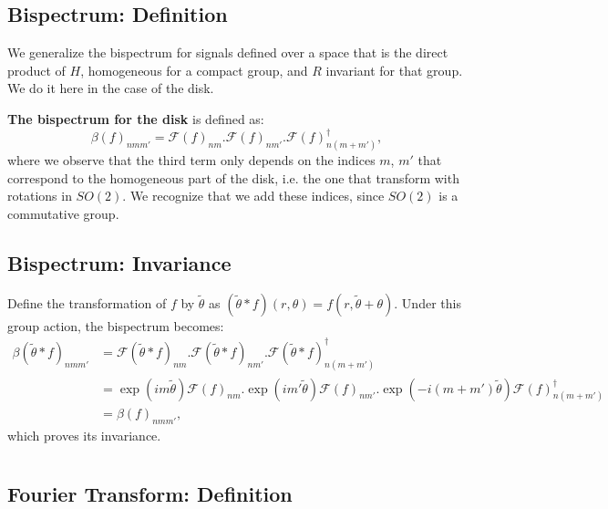 \documentclass{article}
\begin{document}
\subsection{Bispectrum: Definition}

We generalize the bispectrum for signals defined over a space that is the direct product of $H$, homogeneous for a compact group, and $R$ invariant for that group. We do it here in the case of the disk.

\textbf{The bispectrum for the disk} is defined as:
\begin{equation}
    \beta(f)_{nmm'} = \mathcal{F}(f)_{nm}.\mathcal{F}(f)_{nm'}.\mathcal{F}(f)_{n(m+m')}^\dagger,
\end{equation}
where we observe that the third term only depends on the indices $m$, $m'$ that correspond to the homogeneous part of the disk, i.e. the one that transform with rotations in $SO(2)$. We recognize that we add these indices, since $SO(2)$ is a commutative group.

\subsection{Bispectrum: Invariance}


Define the transformation of $f$ by $\tilde \theta$ as $(\tilde{\theta} \ast f)(r, \theta) = f(r, \tilde \theta +\theta )$. Under this group action, the bispectrum becomes:
\begin{align*}
     \beta(\tilde{\theta} \ast f)_{nmm'}
        &= \mathcal{F}(\tilde{\theta} \ast f)_{nm}.\mathcal{F}(\tilde{\theta} \ast f)_{nm'}.\mathcal{F}(\tilde{\theta} \ast f)_{n(m+m')}^\dagger\\
        &= \exp(im\tilde{\theta}) \mathcal{F}(f)_{nm}.\exp(im'\tilde{\theta}) \mathcal{F}(f)_{nm'}.\exp(-i(m+m')\tilde{\theta}) \mathcal{F}(f)_{n(m+m')}^\dagger\\
        &=\beta(f)_{nmm'},
\end{align*}
which proves its invariance.

\section{}

\subsection{Fourier Transform: Definition}
\end{document}
